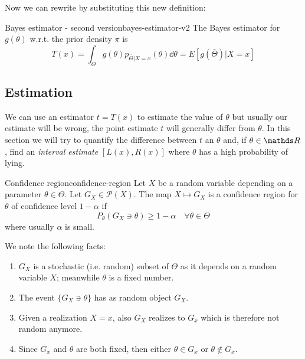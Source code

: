 \documentclass[12pt]{extarticle}
\begin{document}
Now we can rewrite  by substituting this new definition:

\begin{theorem}{Bayes estimator - second version}{bayes-estimator-v2}
	The Bayes estimator for $g(\theta)$ w.r.t. the prior density $\pi$ is
	\begin{equation}
		T(x) = \int_\Theta g(\theta) p_{\bar \Theta | X = x} (\theta) \dd{\theta} = E[g(\bar \Theta) | X = x]
	\end{equation}
\end{theorem}

\subsection{Estimation}

We can use an estimator $t = T(x)$ to estimate the value of $\theta$ but usually our estimate will be wrong, the point estimate $t$ will generally differ from $\theta$.
In this section we will try to quantify the difference between $t$ an $\theta$ and, if $\theta \in \R$, find an \emph{interval estimate} $[L(x), R(x)]$ where $\theta$ has a high probability of lying.

\begin{definition}{Confidence region}{confidence-region}
	Let $X$ be a random variable depending on a parameter $\theta \in \Theta$.
	Let $G_X \in \mathcal P(X)$.
	The map $X \mapsto G_X$ is a confidence region for $\theta$ of confidence level $1-\alpha$ if
	\begin{equation}
		P_\theta(G_X \ni \theta) \geq 1- \alpha \quad \forall \theta \in \Theta
	\end{equation}
	where usually $\alpha$ is small.
\end{definition}

We note the following facts:
\begin{enumerate}
	\item $G_X$ is a stochastic (i.e. random) subset of $\Theta$ as it depends on a random variable $X$; meanwhile $\theta$ is a fixed number.
	\item The event $\{ G_X \ni \theta \}$ has as random object $G_X$.
	\item Given a realization $X = x$, also $G_X$ realizes to $G_x$ which is therefore not random anymore.
	\item Since $G_x$ and $\theta$ are both fixed, then either $\theta \in G_x$ or $\theta \notin G_x$.
\end{enumerate}
\end{document}
